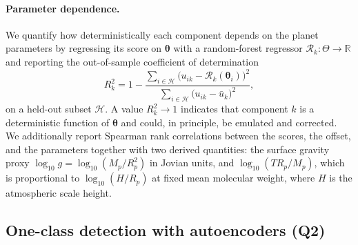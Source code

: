 \paragraph{Parameter dependence.}
We quantify how deterministically each component depends on the planet parameters by regressing its score on $\bm{\theta}$ with a random-forest regressor $\mathcal{R}_k:\Theta\rightarrow\mathbb{R}$ and reporting the out-of-sample coefficient of determination
\begin{equation}
  R^{2}_k = 1-\frac{\sum_{i\in\mathcal{H}}\bigl(u_{ik}-\mathcal{R}_k(\bm{\theta}_i)\bigr)^{2}}{\sum_{i\in\mathcal{H}}\bigl(u_{ik}-\bar{u}_k\bigr)^{2}},
  \label{eq:r2}
\end{equation}
on a held-out subset $\mathcal{H}$.
A value $R^2_k\rightarrow1$ indicates that component $k$ is a deterministic function of $\bm{\theta}$ and could, in principle, be emulated and corrected.
We additionally report Spearman rank correlations between the scores, the offset, and the parameters together with two derived quantities: the surface gravity proxy $\log_{10}g=\log_{10}(M_p/R_p^{2})$ in Jovian units, and $\log_{10}(T R_p/M_p)$, which is proportional to $\log_{10}(H/R_p)$ at fixed mean molecular weight, where $H$ is the atmospheric scale height.

\subsection{One-class detection with autoencoders (Q2)}
\label{sec:ae}

